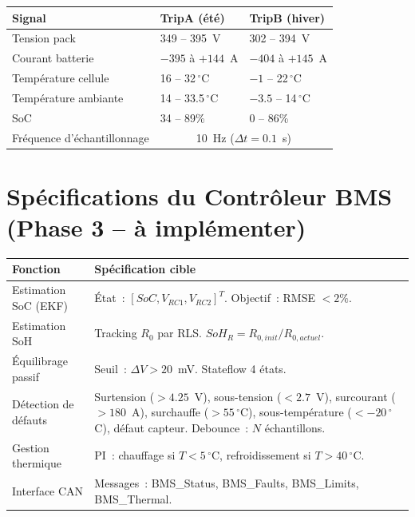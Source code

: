\documentclass[a4paper,11pt]{article}
\begin{document}
\begin{center}
\renewcommand{\arraystretch}{1.3}
\begin{tabular}{lll}
\toprule
\textbf{Signal} & \textbf{TripA (été)} & \textbf{TripB (hiver)} \\
\midrule
Tension pack & 349 -- 395~V & 302 -- 394~V \\
Courant batterie & $-395$ à $+144$~A & $-404$ à $+145$~A \\
Température cellule & 16 -- 32$\,^\circ$C & $-1$ -- 22$\,^\circ$C \\
Température ambiante & 14 -- 33.5$\,^\circ$C & $-3.5$ -- 14$\,^\circ$C \\
SoC & 34 -- 89\% & 0 -- 86\% \\
Fréquence d'échantillonnage & \multicolumn{2}{c}{10~Hz ($\Delta t = 0.1$~s)} \\
\bottomrule
\end{tabular}
\end{center}

\section{Spécifications du Contrôleur BMS (Phase 3 -- à implémenter)}

\begin{center}
\renewcommand{\arraystretch}{1.4}
\begin{tabular}{p{4cm} p{8.5cm}}
\toprule
\textbf{Fonction} & \textbf{Spécification cible} \\
\midrule
Estimation SoC (EKF) &
  État~: $[SoC, V_{RC1}, V_{RC2}]^T$. Objectif~: RMSE $< 2\%$. \\
Estimation SoH &
  Tracking $R_0$ par RLS. $SoH_R = R_{0,init} / R_{0,actuel}$. \\
Équilibrage passif &
  Seuil~: $\Delta V > 20$~mV. Stateflow 4 états. \\
Détection de défauts &
  Surtension ($> 4.25$~V), sous-tension ($< 2.7$~V),
  surcourant ($> 180$~A), surchauffe ($> 55\,^\circ$C),
  sous-température ($< -20\,^\circ$C), défaut capteur. Debounce~: $N$ échantillons. \\
Gestion thermique &
  PI~: chauffage si $T < 5\,^\circ$C, refroidissement si $T > 40\,^\circ$C. \\
Interface CAN &
  Messages~: BMS\_Status, BMS\_Faults, BMS\_Limits, BMS\_Thermal. \\
\bottomrule
\end{tabular}
\end{center}
\end{document}
